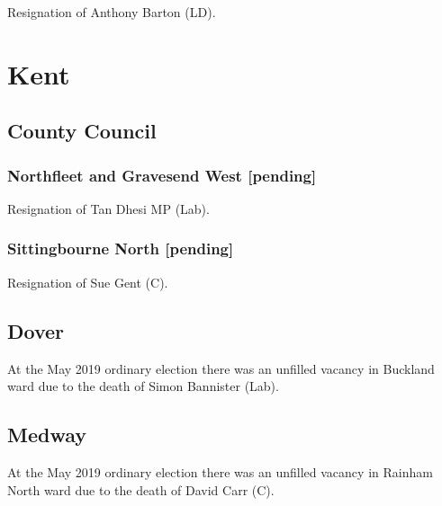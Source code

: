 \documentclass[a4paper,openany]{book}
\begin{document}
\begin{resultsiii}

Resignation of Anthony Barton (LD).

\section{Kent}

\subsection*{County Council}

\subsubsection*{Northfleet and Gravesend West \hspace*{\fill}\nolinebreak[1]%
	\enspace\hspace*{\fill}
	[pending]}


Resignation of Tan Dhesi MP (Lab).

\subsubsection*{Sittingbourne North \hspace*{\fill}\nolinebreak[1]%
	\enspace\hspace*{\fill}
	[pending]}


Resignation of Sue Gent (C).

\subsection*{Dover}

At the May 2019 ordinary election there was an unfilled vacancy in Buckland ward due to the death of Simon Bannister (Lab).

\subsection*{Medway}

At the May 2019 ordinary election there was an unfilled vacancy in Rainham North ward due to the death of David Carr (C).


\end{resultsiii}
\end{document}
